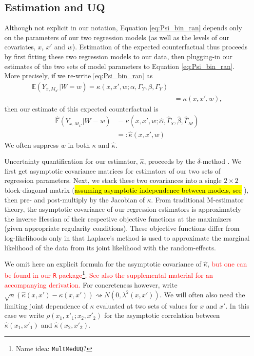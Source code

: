 \documentclass{article}
\newcommand{\bE}{\mathbb{E}}
\begin{document}
\subsection{Estimation and UQ}
\label{sec:CF_UQ}

Although not explicit in our notation, Equation \eqref{eq:Psi_bin_ran} depends only on the parameters of our two regression models (as well as the levels of our covariates, $x$, $x'$ and $w$). Estimation of the expected counterfactual thus proceeds by first fitting these two regression models to our data, then plugging-in our estimates of the two sets of model parameters to Equation \eqref{eq:Psi_bin_ran}. More precisely, if we re-write \eqref{eq:Psi_bin_ran} as
%
\begin{align}
    \bE (Y_{x, M_{x'}} | W=w) = \kappa(x, x', w; \alpha, \Gamma_Y, \beta, \Gamma_Y) \label{eq:kappa}\\
    &= \kappa(x, x', w), 
\end{align}
%
then our estimate of this expected counterfactual is
\begin{align}
    \hat{\bE} (Y_{x, M_{x'}} | W=w) &= \kappa(x, x', w; \hat{\alpha}, \hat{\Gamma}_Y, \hat{\beta}, \hat{\Gamma}_M) \label{eq:kappa_hat}\\
    &=: \hat{\kappa}(x, x', w)
\end{align}
%
We often suppress $w$ in both $\kappa$ and $\hat{\kappa}$. 

Uncertainty quantification for our estimator, $\hat{\kappa}$, proceeds by the $\delta$-method \citep[see, e.g.,][]{vdV98}. We first get asymptotic covariance matrices for estimators of our two sets of regression parameters. Next, we stack these two covariances into a single $2\times 2$ block-diagonal matrix (\hl{assuming asymptotic independence between models, see} \citealp{Bau06}), then pre- and post-multiply by the Jacobian of $\kappa$. From traditional M-estimator theory, the asymptotic covariance of our regression estimators is approximately the inverse Hessian of their respective objective functions at the maximizers (given appropriate regularity conditions). These objective functions differ from log-likelihoods only in that Laplace's method is used to approximate the marginal likelihood of the data from its joint likelihood with the random-effects.

We omit here an explicit formula for the asymptotic covariance of $\hat{\kappa}$, \textcolor{red}{but one can be found in our \texttt{R} package\footnote{Name idea: \texttt{MultMedUQ}?}. See also the supplemental material for an accompanying derivation.} For concreteness however, write $\sqrt{n} (\hat{\kappa}(x, x') - \kappa(x, x')) \rightsquigarrow N(0, \lambda^2(x, x'))$. We will often also need the limiting joint dependence of $\kappa$ evaluated at two sets of values for $x$ and $x'$. In this case we write $\rho(x_1, x'_1; x_2, x'_2)$ for the asymptotic correlation between $\hat{\kappa}(x_1, x'_1)$ and $\hat{\kappa}(x_2, x'_2)$.
\end{document}
